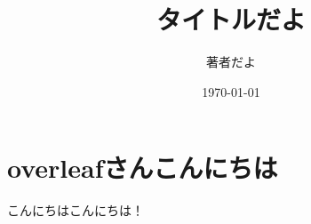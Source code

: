 \documentclass[a4paper]{bxjsarticle}
\title{タイトルだよ}
\author{著者だよ}
\date{\today}
\begin{document}
\maketitle
\tableofcontents

\section{overleafさんこんにちは}
こんにちはこんにちは！
\end{document}
